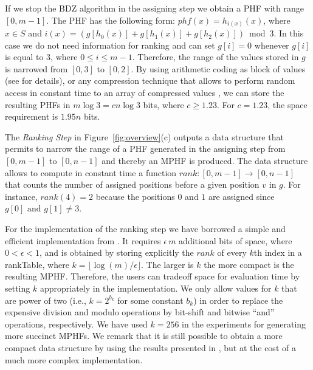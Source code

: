 If we stop the BDZ algorithm in the assigning step
we obtain a PHF with range $[0,m-1]$.
The PHF has the following form:
$phf(x) = h_{i(x)}(x)$, where $x\in S$ and $i(x) = (g[h_0(x)] + g[h_1(x)] + g[h_2(x)]) \bmod 3$.
In this case we do not need information for ranking and
can set $g[i] = 0$ whenever $g[i]$ is equal to 3, where $0 \le i \le m-1$.
Therefore, the range of the values stored in $g$ is narrowed
from $[0,3]$ to $[0,2]$. By using arithmetic coding as block of
values (see \cite{b08,bpz07} for details),
or any compression technique that allows to perform
random access in constant time to an array of compressed values \cite{fn07,gn06,sg06},
we can store the resulting PHFs in $m\log 3  = c n\log 3$ bits,
where $c \ge 1.23$. For $c = 1.23$, the space requirement is $1.95n$ bits.


The {\em Ranking Step} in Figure~\ref{fig:overview}(c)
outputs a data structure
that permits to narrow the range of a PHF generated in the
assigning step from $[0,m-1]$ to $[0,n-1]$ and thereby
an MPHF is produced.
The data structure allows to compute in constant time
a function $\mathit{rank}\!\!:[0,m-1]\to [0,n-1]$
that counts the number of assigned positions
before a given position $v$ in $g$.
For instance, $\mathit{rank}(4) = 2$ because
the positions $0$ and $1$ are assigned
since $g[0] \text{ and } g[1] \not = 3$.

For the implementation of the ranking step
we have borrowed
a simple and efficient implementation from
\cite{dict-jour}.
It requires $\epsilon \, m$ additional bits of space, where $0 < \epsilon < 1$,
and is obtained by storing explicitly the
$\mathit{rank}$ of every $k$th index in a rankTable, where $k
=\lfloor\log(m)/\epsilon\rfloor$.
The larger is $k$ the more compact is the resulting MPHF.
Therefore, the users can tradeoff space for evaluation time
by setting $k$ appropriately in the implementation.
We only allow values for $k$
that are power of two (i.e., $k=2^{b_k}$ for some constant $b_k$) in order to replace the expensive
division and modulo operations by
bit-shift and bitwise ``and'' operations, respectively.
We have used $k=256$
in the experiments
for generating more succinct MPHFs.
We remark that it is still possible to obtain a more compact data structure by
using the results presented in \cite{os07,rrr02}, but at the cost of a much more
complex implementation.

